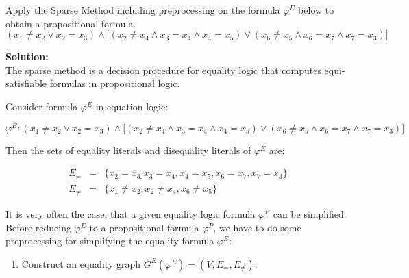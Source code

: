 \documentclass[11pt,a4paper]{uebung}
\newcommand{\solution}[1]{\par {\bf Solution:}\\#1}
\begin{document}

\newpage
{}
Apply the Sparse Method including preprocessing on the formula $\varphi^E$
below to obtain a propositional formula.
\begin{displaymath}
  (x_1 \neq x_2 \lor x_2=x_3 ) \land \big[ (x_2 \neq x_4 \land x_3=x_4
  \land x_4=x_5)
  \lor (x_6 \neq x_5 \land x_6=x_7 \land x_7=x_3)\big]
\end{displaymath}

  \solution{
The sparse method is a decision procedure for equality logic that computes
equi-satisfiable formulas in propositional logic.

Consider formula $\varphi ^{E}$ in equation logic:%

\begin{displaymath}
  \varphi ^{E}: (x_1 \neq x_2 \lor x_2=x_3 ) \land \big[ (x_2 \neq x_4 \land x_3=x_4
  \land x_4=x_5)
  \lor (x_6 \neq x_5 \land x_6=x_7 \land x_7=x_3)\big]
\end{displaymath}

Then the sets of equality literals and disequality literals of $\varphi ^{E}$
are:

\begin{eqnarray*}
E_{=}
&=&%
\{x_{2}=x_{3,}x_{3}=x_{4},x_{4}=x_{5},x_{6}=x_{7},x_{7}=x_{3}\}
\\
E_{\neq } &=&\{x_{1}\neq x_{2},x_{2}\neq x_{4},x_{6}\neq x_{5}\}
\end{eqnarray*}

It is very often the case, that a given equality logic formula $\varphi ^{E}$
can be simplified. Before reducing $\varphi ^{E}$ to a propositional formula 
$\varphi ^{P}$, we have to do some preprocessing for simplifying the
equality formula $\varphi ^{E}$:

\begin{enumerate}
\item Construct an equality graph $G^{E}(\varphi ^{E})=(V,E_{=},E_{\neq })$:


\end{enumerate}}
\end{document}
